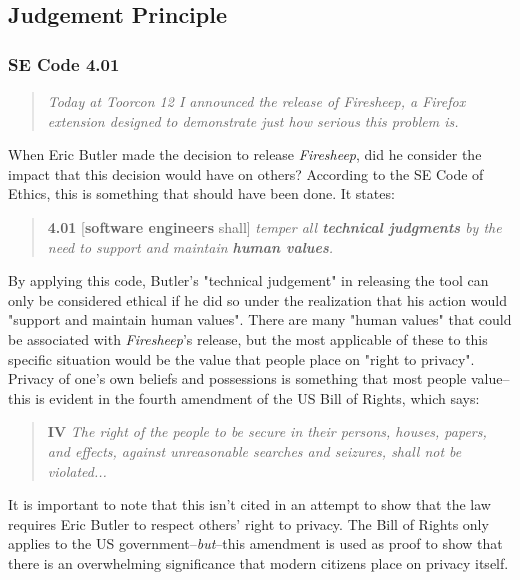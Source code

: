 \documentclass[11pt]{article}
\begin{document}
\begin{multicols}{2}
\subsection{Judgement Principle}
\subsubsection{SE Code 4.01}
\begin{quote}
  \emph{Today at Toorcon 12 I announced the release of Firesheep, a Firefox extension designed to demonstrate just how serious this problem is.} \cite{codebutler_main}
\end{quote}

When Eric Butler made the decision to release \emph{Firesheep}, did he consider the impact that this decision would have on others? According to the SE Code of Ethics, this is something that should have been done. It states:


\begin{quote}
\textbf{4.01} [\textbf{software engineers} shall] \emph{temper all \textbf{technical judgments} by the need to support and maintain \textbf{human values}.} \cite{se_code}
\end{quote}

By applying this code, Butler's "technical judgement" in releasing the tool can only be considered ethical if he did so under the realization that his action would "support and maintain human values". There are many "human values" that could be associated with \emph{Firesheep}'s release, but the most applicable of these to this specific situation would be the value that people place on "right to privacy". Privacy of one's own beliefs and possessions is something that most people value--this is evident in the fourth amendment of the US Bill of Rights, which says:

\begin{quote}
\textbf{IV} \emph{The right of the people to be secure in their persons, houses, papers, and effects, against unreasonable searches and seizures, shall not be violated...} \cite{bill_of_rights}
\end{quote}

It is important to note that this isn't cited in an attempt to show that the law requires Eric Butler to respect others' right to privacy. The Bill of Rights only applies to the US government--\emph{but}--this amendment is used as proof to show that there is an overwhelming significance that modern citizens place on privacy itself.


\end{multicols}
\end{document}
